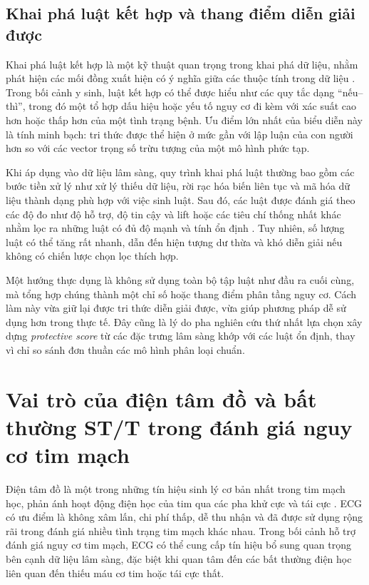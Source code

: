 \blocksep

\subsection{Khai phá luật kết hợp và thang điểm diễn giải được}

\blocksep

Khai phá luật kết hợp là một kỹ thuật quan trọng trong khai phá dữ liệu, nhằm phát hiện các mối đồng xuất hiện có ý nghĩa giữa các thuộc tính trong dữ liệu \cite{Lavrac1999}. Trong bối cảnh y sinh, luật kết hợp có thể được hiểu như các quy tắc dạng “nếu--thì”, trong đó một tổ hợp dấu hiệu hoặc yếu tố nguy cơ đi kèm với xác suất cao hơn hoặc thấp hơn của một tình trạng bệnh. Ưu điểm lớn nhất của biểu diễn này là tính minh bạch: tri thức được thể hiện ở mức gần với lập luận của con người hơn so với các vector trọng số trừu tượng của một mô hình phức tạp.

\blocksep

Khi áp dụng vào dữ liệu lâm sàng, quy trình khai phá luật thường bao gồm các bước tiền xử lý như xử lý thiếu dữ liệu, rời rạc hóa biến liên tục và mã hóa dữ liệu thành dạng phù hợp với việc sinh luật. Sau đó, các luật được đánh giá theo các độ đo như độ hỗ trợ, độ tin cậy và lift hoặc các tiêu chí thống nhất khác nhằm lọc ra những luật có đủ độ mạnh và tính ổn định \cite{Lavrac1999}. Tuy nhiên, số lượng luật có thể tăng rất nhanh, dẫn đến hiện tượng dư thừa và khó diễn giải nếu không có chiến lược chọn lọc thích hợp.

\blocksep

Một hướng thực dụng là không sử dụng toàn bộ tập luật như đầu ra cuối cùng, mà tổng hợp chúng thành một chỉ số hoặc thang điểm phân tầng nguy cơ. Cách làm này vừa giữ lại được tri thức diễn giải được, vừa giúp phương pháp dễ sử dụng hơn trong thực tế. Đây cũng là lý do pha nghiên cứu thứ nhất lựa chọn xây dựng \textit{protective score} từ các đặc trưng lâm sàng khớp với các luật ổn định, thay vì chỉ so sánh đơn thuần các mô hình phân loại chuẩn.

\blocksep

\section{Vai trò của điện tâm đồ và bất thường ST/T trong đánh giá nguy cơ tim mạch}

\blocksep

Điện tâm đồ là một trong những tín hiệu sinh lý cơ bản nhất trong tim mạch học, phản ánh hoạt động điện học của tim qua các pha khử cực và tái cực \cite{Clifford2006}. ECG có ưu điểm là không xâm lấn, chi phí thấp, dễ thu nhận và đã được sử dụng rộng rãi trong đánh giá nhiều tình trạng tim mạch khác nhau. Trong bối cảnh hỗ trợ đánh giá nguy cơ tim mạch, ECG có thể cung cấp tín hiệu bổ sung quan trọng bên cạnh dữ liệu lâm sàng, đặc biệt khi quan tâm đến các bất thường điện học liên quan đến thiếu máu cơ tim hoặc tái cực thất.

